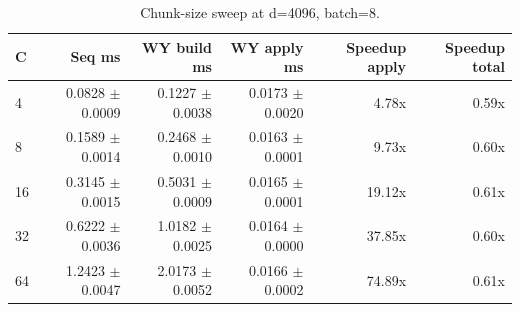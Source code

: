 \begin{table}[t]
  \centering
  \caption{Chunk-size sweep at d=4096, batch=8.}
  \label{tab:sweep-c}
  \begin{tabular}{lrrrrr}
    \hline
    C & Seq ms & WY build ms & WY apply ms & Speedup apply & Speedup total \\
    \hline
    4 & 0.0828 $\pm$ 0.0009 & 0.1227 $\pm$ 0.0038 & 0.0173 $\pm$ 0.0020 & 4.78x & 0.59x \\
    8 & 0.1589 $\pm$ 0.0014 & 0.2468 $\pm$ 0.0010 & 0.0163 $\pm$ 0.0001 & 9.73x & 0.60x \\
    16 & 0.3145 $\pm$ 0.0015 & 0.5031 $\pm$ 0.0009 & 0.0165 $\pm$ 0.0001 & 19.12x & 0.61x \\
    32 & 0.6222 $\pm$ 0.0036 & 1.0182 $\pm$ 0.0025 & 0.0164 $\pm$ 0.0000 & 37.85x & 0.60x \\
    64 & 1.2423 $\pm$ 0.0047 & 2.0173 $\pm$ 0.0052 & 0.0166 $\pm$ 0.0002 & 74.89x & 0.61x \\
    \hline
  \end{tabular}
\end{table}
